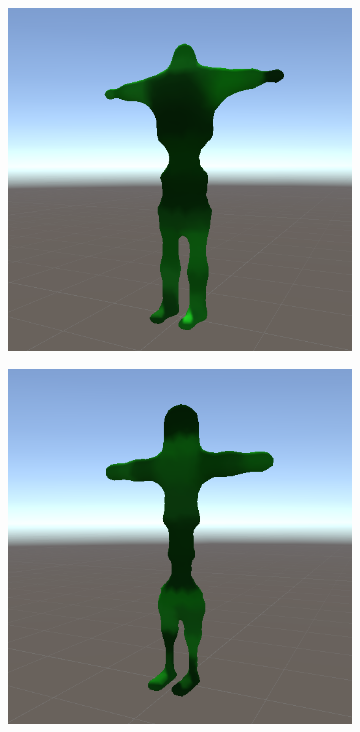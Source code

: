 \begin{figure}[ht]
\begin{subfigure}[b]{0.2\textwidth}
    \end{subfigure}
    \begin{subfigure}[b]{0.2\textwidth}
        \centering
        \includegraphics[width=\textwidth, height=\textwidth]{resources/img/Finished_Creatures_2/creature_10}
    \end{subfigure}
    \begin{subfigure}[b]{0.2\textwidth}
        \centering
        \includegraphics[width=\textwidth, height=\textwidth]{resources/img/Finished_Creatures_2/creature_11}

\end{subfigure}
\end{figure}
